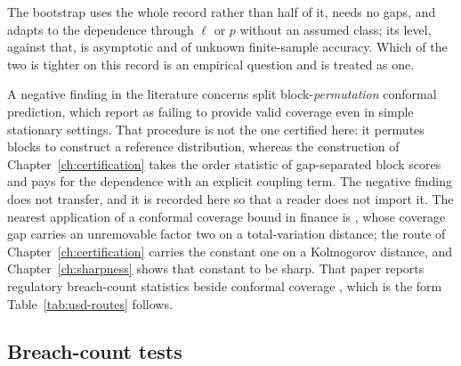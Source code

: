 \documentclass[../../../main.tex]{subfiles}
\begin{document}

The bootstrap uses the whole record rather than half of it, needs no gaps, and adapts to the dependence through $\ell$ or $p$ without an assumed class; its level, against that, is asymptotic and of unknown finite-sample accuracy. Which of the two is tighter on this record is an empirical question and is treated as one.

\begin{remark}\label{rem:usd-notscp}
A negative finding in the literature concerns split block-\emph{permutation} conformal prediction, which \citet[p.~15]{stocker2025} report as failing to provide valid coverage even in simple stationary settings. That procedure is not the one certified here: it permutes blocks to construct a reference distribution, whereas the construction of Chapter~\ref{ch:certification} takes the order statistic of gap-separated block scores and pays for the dependence with an explicit coupling term. The negative finding does not transfer, and it is recorded here so that a reader does not import it. The nearest application of a conformal coverage bound in finance is \citet[Thm.~1]{schmitt2026}, whose coverage gap carries an unremovable factor two on a total-variation distance; the route of Chapter~\ref{ch:certification} carries the constant one on a Kolmogorov distance, and Chapter~\ref{ch:sharpness} shows that constant to be sharp. That paper reports regulatory breach-count statistics beside conformal coverage \citep[Table~1, p.~4]{schmitt2026}, which is the form Table~\ref{tab:usd-routes} follows.
\end{remark}

\subsection{Breach-count tests}
\end{document}
